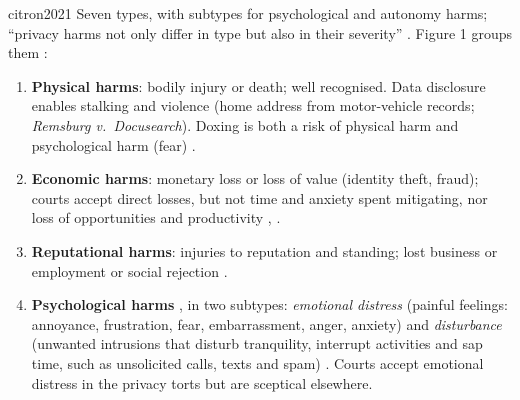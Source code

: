 \begin{papercard}{citron2021}
 Seven types, with subtypes for psychological and autonomy harms; ``privacy harms not only differ in type but also in their severity'' . Figure 1 groups them :
\begin{enumerate}[nosep,leftmargin=*]
\item \textbf{Physical harms}: bodily injury or death; well recognised. Data disclosure enables stalking and violence (home address from motor-vehicle records; \emph{Remsburg v.\ Docusearch}). Doxing is both a risk of physical harm and psychological harm (fear) .
\item \textbf{Economic harms}: monetary loss or loss of value (identity theft, fraud); courts accept direct losses, but not time and anxiety spent mitigating, nor loss of opportunities and productivity , .
\item \textbf{Reputational harms}: injuries to reputation and standing; lost business or employment or social rejection .
\item \textbf{Psychological harms} , in two subtypes: \emph{emotional distress} (painful feelings: annoyance, frustration, fear, embarrassment, anger, anxiety)  and \emph{disturbance} (unwanted intrusions that disturb tranquility, interrupt activities and sap time, such as unsolicited calls, texts and spam) . Courts accept emotional distress in the privacy torts but are sceptical elsewhere.

\end{enumerate}
\end{papercard}

